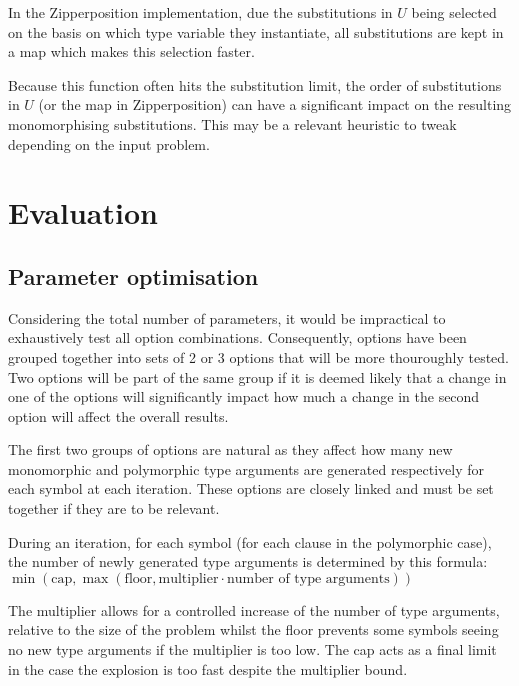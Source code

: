 \documentclass[]{ceurart}
\begin{document}
In the Zipperposition implementation, due the substitutions in \(U\) being selected on the basis on which type variable they instantiate, all substitutions are kept in a map which makes this selection faster.

Because this function often hits the substitution limit, the order of substitutions in \(U\) (or the map in Zipperposition) can have a significant impact on the resulting monomorphising substitutions. This may be a relevant heuristic to tweak depending on the input problem.


\section{Evaluation}
\label{sec:evaluation}


\subsection{Parameter optimisation}

Considering the total number of parameters, it would be impractical to exhaustively test all option combinations. Consequently, options have been grouped together into sets of 2 or 3 options that will be more thouroughly tested. Two options will be part of the same group if it is deemed likely that a change in one of the options will significantly impact how much a change in the second option will affect the overall results.

The first two groups of options are natural as they affect how many new monomorphic and polymorphic type arguments are generated respectively for each symbol at each iteration. These options are closely linked and must be set together if they are to be relevant.

During an iteration, for each symbol (for each clause in the polymorphic case), the number of newly generated type arguments is determined by this formula:
\( \min(\text{cap}, \max(\text{floor}, \text{multiplier} \cdot \text{number of type arguments})) \)

The multiplier allows for a controlled increase of the number of type arguments, relative to the size of the problem whilst the floor prevents some symbols seeing no new type arguments if the multiplier is too low.
The cap acts as a final limit in the case the explosion is too fast despite the multiplier bound.
\end{document}
